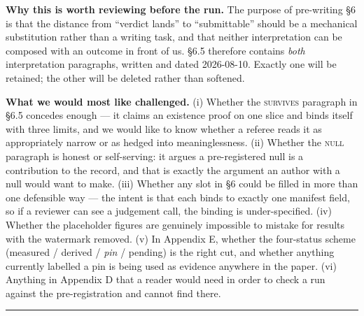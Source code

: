 \documentclass[10pt]{article}
\begin{document}
\medskip
\noindent\textbf{Why this is worth reviewing before the run.} The purpose of pre-writing \S6 is
that the distance from ``verdict lands'' to ``submittable'' should be a mechanical substitution
rather than a writing task, and that neither interpretation can be composed with an outcome in
front of us. \S6.5 therefore contains \emph{both} interpretation paragraphs, written and dated
2026-08-10. Exactly one will be retained; the other will be deleted rather than softened.

\medskip
\noindent\textbf{What we would most like challenged.}
(i) Whether the \textsc{survives} paragraph in \S6.5 concedes enough --- it claims an existence
proof on one slice and binds itself with three limits, and we would like to know whether a
referee reads it as appropriately narrow or as hedged into meaninglessness.
(ii) Whether the \textsc{null} paragraph is honest or self-serving: it argues a pre-registered
null is a contribution to the record, and that is exactly the argument an author with a null
would want to make.
(iii) Whether any slot in \S6 could be filled in more than one defensible way --- the intent is
that each binds to exactly one manifest field, so if a reviewer can see a judgement call, the
binding is under-specified.
(iv) Whether the placeholder figures are genuinely impossible to mistake for results with the
watermark removed.
(v) In Appendix E, whether the four-status scheme (measured / derived / \emph{pin} / pending) is
the right cut, and whether anything currently labelled a pin is being used as evidence anywhere
in the paper.
(vi) Anything in Appendix D that a reader would need in order to check a run against the
pre-registration and cannot find there.

\bigskip
\hrule
\bigskip




\clearpage
\appendix
\setcounter{section}{3}   %



\clearpage


\end{document}
